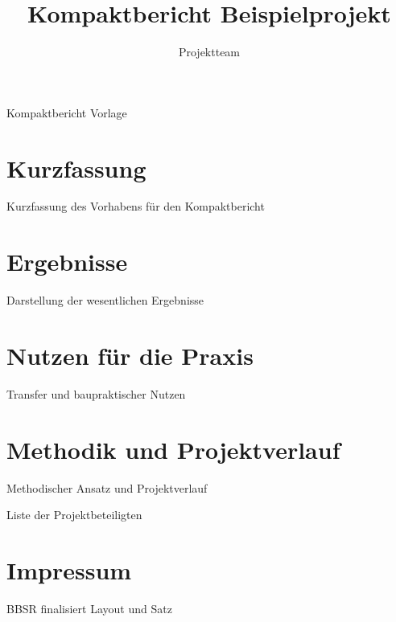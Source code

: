 \title{Kompaktbericht Beispielprojekt}
\author{Projektteam}




\maketitle

\begin{Panel}[anchor=top-right, x=1cm, y=5cm, width=5.5cm]
  Kompaktbericht Vorlage
\end{Panel}

\section*{Kurzfassung}
Kurzfassung des Vorhabens für den Kompaktbericht

\section{Ergebnisse}
Darstellung der wesentlichen Ergebnisse

\section{Nutzen für die Praxis}
Transfer und baupraktischer Nutzen

\section{Methodik und Projektverlauf}
Methodischer Ansatz und Projektverlauf \cite{example2026,building2025}

\makeappendices
{}
Liste der Projektbeteiligten

\makeregisters

\section*{Impressum}
BBSR finalisiert Layout und Satz


